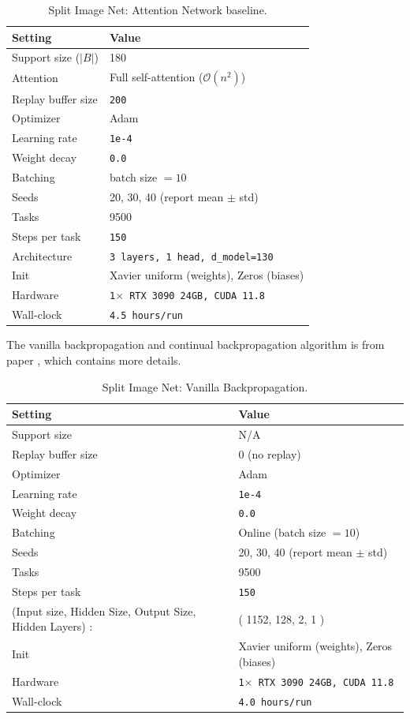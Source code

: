 \documentclass{article}
\begin{document}
\begin{table}[H]
\centering
\footnotesize
\caption{Split Image Net: Attention Network baseline.}
\label{tab:split_image_net_attention}
\begin{tabular}{@{}ll@{}}
\toprule
Setting & Value \\ \midrule
Support size ($|B|$) & 180 \\
Attention & Full self-attention ($\mathcal{O}(n^2)$) \\
Replay buffer size & \texttt{200} \\
Optimizer & Adam \\
Learning rate & \texttt{1e-4} \\
Weight decay & \texttt{0.0} \\
Batching & batch size $=10$ \\
Seeds & 20, 30, 40 (report mean $\pm$ std) \\
Tasks & 9500 \\
Steps per task & \texttt{150} \\
Architecture & \texttt{3 layers, 1 head, d\_model=130} \\
Init & Xavier uniform (weights), Zeros (biases) \\
Hardware & \texttt{1$\times$ RTX 3090 24GB, CUDA 11.8} \\
Wall-clock & \texttt{4.5 hours/run} \\
\bottomrule
\end{tabular}
\end{table}

The vanilla backpropagation and continual backpropagation algorithm is from paper \citep{dohare2024loss}, which contains more details.

\begin{table}[H]
\centering
\footnotesize
\caption{Split Image Net: Vanilla Backpropagation.}
\label{tab:split_image_net_bp}
\begin{tabular}{@{}ll@{}}
\toprule
Setting & Value \\ \midrule
Support size & N/A \\
Replay buffer size & 0 (no replay) \\
Optimizer & Adam \\
Learning rate & \texttt{1e-4} \\
Weight decay & \texttt{0.0} \\
Batching & Online (batch size $=10$) \\
Seeds & 20, 30, 40 (report mean $\pm$ std) \\
Tasks & 9500 \\
Steps per task & \texttt{150} \\
(Input size, Hidden Size, Output Size, Hidden Layers) : & ( 1152, 128, 2, 1 ) \\ 
Init &  Xavier uniform (weights), Zeros (biases) \\
Hardware & \texttt{1$\times$ RTX 3090 24GB, CUDA 11.8} \\
Wall-clock & \texttt{4.0 hours/run} \\
\bottomrule
\end{tabular}
\end{table}
\end{document}
